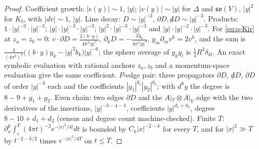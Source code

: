 \begin{proof}
Coefficient growth: $|\epsilon(y)|\sim1$, $|y|$; $|v(y)|\sim|y|$ for $\Delta$ and $\mathfrak{so}(V)$, $|y|^2$ for $K_b$, with $|dv|\sim1$, $|y|$. Line decay: $D\sim|y|^{-2}$, $\partial D,{\not d}D\sim|y|^{-3}$. Products: $1\cdot|y|^{-3}\cdot|y|^{-3}$; $|y|\cdot|y|^{-3}\cdot|y|^{-3}$; $|y|^2\cdot|y|^{-3}\cdot|y|^{-3}$ and $|y|\cdot|y|^{-2}\cdot|y|^{-3}$. For \eqref{eq:o-Kir} at $z_a=z_b=0$: $v\cdot\partial D=\tfrac{2(b\cdot y)}{4\pi^2|y|^2}$, $\partial_kD=-\tfrac{2y_k}{4\pi^2|y|^4}$, $y_m\partial_mv^k=2v^k$, and the sum is $\frac{4}{(4\pi^2)^2}\big((b\cdot y)y_k-|y|^2b_k\big)|y|^{-6}$; the sphere average of $y_ky_l$ is $\tfrac14R^2\delta_{kl}$. An exact symbolic evaluation with rational anchors $z_a,z_b$ and a momentum-space evaluation give the same coefficient. $P$-edge pair: three propagators $\partial D$, ${\not d}D$, $\partial D$ of order $|y|^{-3}$ each and the coefficients $|y_1|^{g_1}|y_2|^{g_2}$; with $d^8y$ the degree is $8-9+g_1+g_2$. Even chain: two edges $\partial D$ and the $A|_V\otimes A|_V$ edge with the two derivatives of the insertions, $|y|^{-3-4-3}$, coefficients $|y|^{d_1+d_2}$, degree $8-10+d_1+d_2$ (census and degree count machine-checked). Finite $T$: $\partial^k_x\int_\varepsilon^T(4\pi t)^{-2}e^{-|x|^2/4t}dt$ is bounded by $C_k|x|^{-2-k}$ for every $T$, and for $|x|^2\gg T$ by $t^{-2-k/2}$ times $e^{-|x|^2/4T}$ on $t\le T$.
\end{proof}

